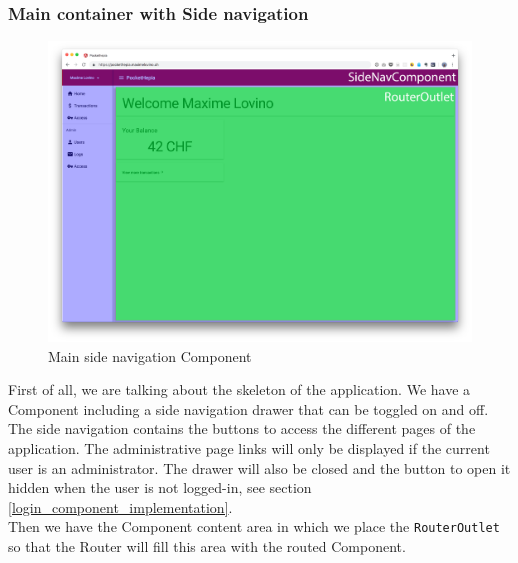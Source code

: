 \documentclass[twoside, openright,11pt,a4paper]{book}
\begin{document}
\subsubsection{Main container with Side navigation}
\begin{figure}[H]
\begin{center}
	\includegraphics[width=\textwidth]{assets/screens/angular/sidenav}
	\caption{Main side navigation Component}
	\label{sidenav_screen}
\end{center}
\end{figure}

First of all, we are talking about the skeleton of the application. We have a Component including a side navigation drawer\cite{angular:material:component:sidenav} that can be toggled on and off. The side navigation contains the buttons to access the different pages of the application. The administrative page links will only be displayed if the current user is an administrator. The drawer will also be closed and the button to open it hidden when the user is not logged-in, see section \ref{login_component_implementation}.\\

Then we have the Component content area in which we place the \verb+RouterOutlet+ so that the Router will fill this area with the routed Component.
\end{document}
